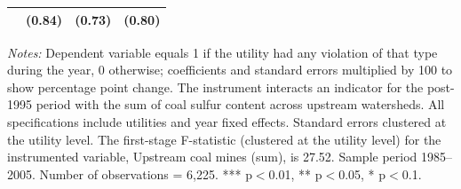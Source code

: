 \begin{table}[htbp]
{\begin{tabular}{p{5.5cm}>{\raggedleft\arraybackslash}p{3cm}>{\raggedleft\arraybackslash}p{3cm}>{\raggedleft\arraybackslash}p{3cm}}
 & (\phantom{-}0.84)\phantom{$^{***}$} & (\phantom{-}0.73)\phantom{$^{***}$} & (\phantom{-}0.80)\phantom{$^{***}$} \\
\bottomrule
\end{tabular}
}
\begin{minipage}{15.6247cm}
\vspace{4pt}
\footnotesize
\raggedright
\textit{Notes:} Dependent variable equals 1 if the utility had any violation of that type during the year, 0 otherwise; coefficients and standard errors multiplied by 100 to show percentage point change. The instrument interacts an indicator for the post-1995 period with the sum of coal sulfur content across upstream watersheds. All specifications include utilities and year fixed effects. Standard errors clustered at the utility level. The first-stage F-statistic (clustered at the utility level) for the instrumented variable, Upstream coal mines (sum), is 27.52. Sample period 1985--2005. Number of observations = 6,225. *** p$<$0.01, ** p$<$0.05, * p$<$0.1.
\end{minipage}
\end{table}
